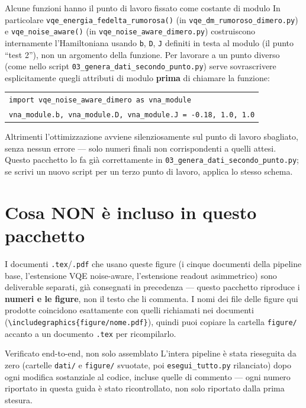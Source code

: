 \documentclass[11pt,a4paper]{article}
\newcommand{\code}[1]{\texttt{\small #1}}
\begin{document}
\begin{warnbox}{Alcune funzioni hanno il punto di lavoro fissato come costante di modulo}
In particolare \code{vqe\_energia\_fedelta\_rumorosa()} (in
\code{vqe\_dm\_rumoroso\_dimero.py}) e \code{vqe\_noise\_aware()} (in
\code{vqe\_noise\_aware\_dimero.py}) costruiscono internamente
l'Hamiltoniana usando \code{b}, \code{D}, \code{J} definiti in testa al
modulo (il punto ``test 2''), non un argomento della funzione. Per
lavorare a un punto diverso (come nello script
\code{03\_genera\_dati\_secondo\_punto.py}) serve sovrascrivere
esplicitamente quegli attributi di modulo \textbf{prima} di chiamare la
funzione:
\begin{center}
\begin{tabular}{@{}l@{}}
\code{import vqe\_noise\_aware\_dimero as vna\_module}\\
\code{vna\_module.b, vna\_module.D, vna\_module.J = -0.18, 1.0, 1.0}\\
\end{tabular}
\end{center}
Altrimenti l'ottimizzazione avviene silenziosamente sul punto di lavoro
sbagliato, senza nessun errore --- solo numeri finali non corrispondenti
a quelli attesi. Questo pacchetto lo fa già correttamente in
\code{03\_genera\_dati\_secondo\_punto.py}; se scrivi un nuovo script per
un terzo punto di lavoro, applica lo stesso schema.
\end{warnbox}

\section{Cosa NON è incluso in questo pacchetto}

I documenti \code{.tex}/\code{.pdf} che usano queste figure (i cinque
documenti della pipeline base, l'estensione VQE noise-aware,
l'estensione readout asimmetrico) sono deliverable separati, già
consegnati in precedenza --- questo pacchetto riproduce i
\textbf{numeri e le figure}, non il testo che li commenta. I nomi dei
file delle figure qui prodotte coincidono esattamente con quelli
richiamati nei documenti (\code{\textbackslash includegraphics\{figure/nome.pdf\}}),
quindi puoi copiare la cartella \code{figure/} accanto a un documento
\code{.tex} per ricompilarlo.

\begin{okbox}{Verificato end-to-end, non solo assemblato}
L'intera pipeline è stata rieseguita da zero (cartelle \code{dati/} e
\code{figure/} svuotate, poi \code{esegui\_tutto.py} rilanciato) dopo
ogni modifica sostanziale al codice, incluse quelle di commento --- ogni
numero riportato in questa guida è stato ricontrollato, non solo
riportato dalla prima stesura.
\end{okbox}
\end{document}
